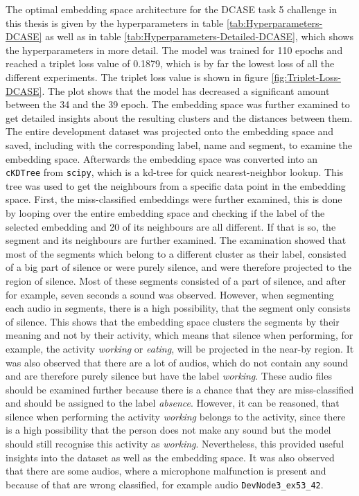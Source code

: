 The optimal embedding space architecture for the DCASE task 5 challenge in this thesis is given by the hyperparameters in table \ref{tab:Hyperparameters-DCASE} as well as in table \ref{tab:Hyperparameters-Detailed-DCASE}, which shows the hyperparameters in more detail.
\newline
\newline
The model was trained for 110 epochs and reached a triplet loss value of 0.1879, which is by far the lowest loss of all the different experiments. The triplet loss value is shown in figure \ref{fig:Triplet-Loss-DCASE}. The plot shows that the model has decreased a significant amount between the 34 and the 39 epoch. 
\newline
\newline
The embedding space was further examined to get detailed insights about the resulting clusters and the distances between them.  The entire development dataset was projected onto the embedding space and saved, including with the corresponding label, name and segment, to examine the embedding space. Afterwards the embedding space was converted into an \texttt{cKDTree} from \texttt{scipy}, which is a kd-tree for quick nearest-neighbor lookup. This tree was used to get the neighbours from a specific data point in the embedding space.
\newline
\newline
First, the miss-classified embeddings were further examined, this is done by looping over the entire embedding space and checking if the label of the selected embedding and 20 of its neighbours are all different. If that is so, the segment and its neighbours are further examined. The examination showed that most of the segments which belong to a different cluster as their label, consisted of a big part of silence or were purely silence, and were therefore projected to the region of silence. Most of these segments consisted of a part of silence, and after for example, seven seconds a sound was observed. However, when segmenting each audio in segments, there is a high possibility, that the segment only consists of silence. This shows that the embedding space clusters the segments by their meaning and not by their activity, which means that silence when performing, for example, the activity \textit{working} or \textit{eating}, will be projected in the near-by region. It was also observed that there are a lot of audios, which do not contain any sound and are therefore purely silence but have the label \textit{working}. These audio files should be examined further because there is a chance that they are miss-classified and should be assigned to the label \textit{absence}. However, it can be reasoned, that silence when performing the activity \textit{working} belongs to the activity, since there is a high possibility that the person does not make any sound but the model should still recognise this activity as \textit{working}. Nevertheless, this provided useful insights into the dataset as well as the embedding space. It was also observed that there are some audios, where a microphone malfunction is present and because of that are wrong classified, for example audio \texttt{DevNode3\_ex53\_42}.
